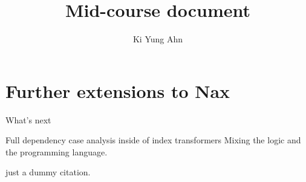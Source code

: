 \documentclass[letterpaper,12pt]{article}
\title{Mid-course document}
\author{Ki Yung Ahn}
\begin{document}
\maketitle












\section{Further extensions to Nax}\label{sec:ext}
What's next


Full dependency
case analysis inside of index transformers
Mixing the logic and the programming language.


\cite{bgb} just a dummy citation.

% 

\end{document}
